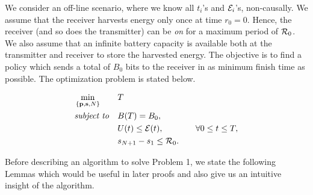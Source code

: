 We consider an off-line scenario, where we know all $t_i$'s and $\mathcal{E}_i$'s, non-causally. We assume that the receiver harvests energy only once at time $r_0=0$. Hence, the receiver (and so does the transmitter) can be \textit{on} for a maximum period of $\mathcal{R}_0$. We also assume that an infinite battery capacity is available both at the transmitter and receiver to store the harvested energy. The objective is to find a policy which sends a total of $B_0$ bits to the receiver in as minimum finish time as possible. The optimization problem is stated below.

\begin{problem}
\begin{align}
&\min_{\{\textbf{p},\textbf{s},N\}}			&& T
\\
&\text{\textit{subject to}} 				&& B(T)=B_0, 
\label{pb1_constraint_bits}
\\
&     										&& U(t)\le \mathcal{E}(t),  		&&& \forall 0\le t\le T, \label{pb1_constraint_energy}
\\
&    										&& s_{N+1}-s_1\le \mathcal{R}_0.
\label{pb1_constraint_time}
\end{align}
\end{problem}
Before describing an algorithm to solve Problem 1, we state the following Lemmas which would be useful in later proofs and also give us an intuitive insight of the algorithm.



%